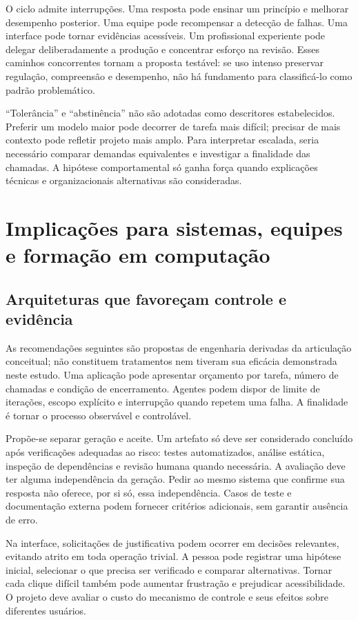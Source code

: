 \documentclass[11pt,a4paper]{article}
\begin{document}
O ciclo admite interrupções. Uma resposta pode ensinar um princípio e melhorar desempenho posterior. Uma equipe pode recompensar a detecção de falhas. Uma interface pode tornar evidências acessíveis. Um profissional experiente pode delegar deliberadamente a produção e concentrar esforço na revisão. Esses caminhos concorrentes tornam a proposta testável: se uso intenso preservar regulação, compreensão e desempenho, não há fundamento para classificá-lo como padrão problemático.

``Tolerância'' e ``abstinência'' não são adotadas como descritores estabelecidos. Preferir um modelo maior pode decorrer de tarefa mais difícil; precisar de mais contexto pode refletir projeto mais amplo. Para interpretar escalada, seria necessário comparar demandas equivalentes e investigar a finalidade das chamadas. A hipótese comportamental só ganha força quando explicações técnicas e organizacionais alternativas são consideradas.

\section{Implicações para sistemas, equipes e formação em computação}
\subsection{Arquiteturas que favoreçam controle e evidência}
As recomendações seguintes são propostas de engenharia derivadas da articulação conceitual; não constituem tratamentos nem tiveram sua eficácia demonstrada neste estudo. Uma aplicação pode apresentar orçamento por tarefa, número de chamadas e condição de encerramento. Agentes podem dispor de limite de iterações, escopo explícito e interrupção quando repetem uma falha. A finalidade é tornar o processo observável e controlável.

Propõe-se separar geração e aceite. Um artefato só deve ser considerado concluído após verificações adequadas ao risco: testes automatizados, análise estática, inspeção de dependências e revisão humana quando necessária. A avaliação deve ter alguma independência da geração. Pedir ao mesmo sistema que confirme sua resposta não oferece, por si só, essa independência. Casos de teste e documentação externa podem fornecer critérios adicionais, sem garantir ausência de erro.

Na interface, solicitações de justificativa podem ocorrer em decisões relevantes, evitando atrito em toda operação trivial. A pessoa pode registrar uma hipótese inicial, selecionar o que precisa ser verificado e comparar alternativas. Tornar cada clique difícil também pode aumentar frustração e prejudicar acessibilidade. O projeto deve avaliar o custo do mecanismo de controle e seus efeitos sobre diferentes usuários.
\end{document}
